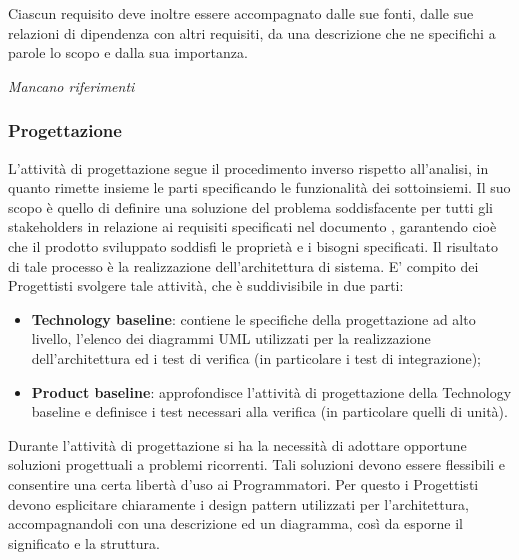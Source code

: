                     Ciascun requisito deve inoltre essere accompagnato dalle sue fonti, dalle sue relazioni di dipendenza con altri requisiti, da una descrizione che ne specifichi a parole lo scopo e dalla sua importanza.
                    
                \textit{Mancano riferimenti}
                
            \subsubsection{Progettazione}
            L'attività di progettazione segue il procedimento inverso rispetto all'analisi, in quanto rimette insieme le parti specificando le funzionalità dei sottoinsiemi. Il suo scopo è quello di definire una soluzione del problema soddisfacente per tutti gli stakeholders in relazione ai requisiti specificati nel documento \AdR{}, garantendo cioè che il prodotto sviluppato soddisfi le proprietà e i bisogni specificati. Il risultato di tale processo è la realizzazione dell'architettura di sistema.
            E' compito dei Progettisti svolgere tale attività, che è suddivisibile in due parti:
            \begin{itemize}
            	\item{\textbf{Technology baseline}: contiene le specifiche della progettazione ad alto livello, l'elenco dei diagrammi UML utilizzati per la realizzazione dell'architettura ed i test di verifica (in particolare i test di integrazione);}
		\item{\textbf{Product baseline}: approfondisce l'attività di progettazione della Technology baseline e definisce i test necessari alla verifica (in particolare quelli di unità).}
	     \end{itemize}
	     
                	Durante l'attività di progettazione si ha la necessità di adottare opportune soluzioni progettuali a problemi ricorrenti. Tali soluzioni devono essere flessibili e consentire una certa libertà d'uso ai Programmatori. Per questo i Progettisti devono esplicitare chiaramente i design pattern utilizzati per l'architettura, accompagnandoli con una descrizione ed un diagramma, così da esporne il significato e la struttura.
	
